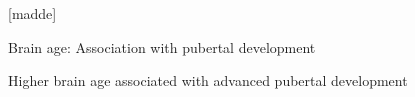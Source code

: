 \documentclass[9pt]{beamer}
\begin{document}
    [madde]
	\begin{frame}{Brain age: Association with pubertal development}
		\centering
		\vfill
		\vfill
        Higher brain age associated with advanced pubertal development
	\end{frame}
\end{document}
